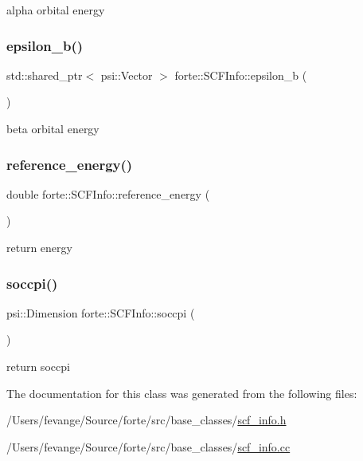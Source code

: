 alpha orbital energy 

\mbox{\label{classforte_1_1_s_c_f_info_ae7bece269ec34eee0f9e47bd07d69a44}} 
\subsubsection{\texorpdfstring{epsilon\+\_\+b()}{epsilon\_b()}}
{\footnotesize\ttfamily std\+::shared\+\_\+ptr$<$ psi\+::\+Vector $>$ forte\+::\+S\+C\+F\+Info\+::epsilon\+\_\+b (\begin{DoxyParamCaption}{ }\end{DoxyParamCaption})}



beta orbital energy 

\mbox{\label{classforte_1_1_s_c_f_info_ac2c9c172c0a76720d80c2aae2fe0fb92}} 
\subsubsection{\texorpdfstring{reference\+\_\+energy()}{reference\_energy()}}
{\footnotesize\ttfamily double forte\+::\+S\+C\+F\+Info\+::reference\+\_\+energy (\begin{DoxyParamCaption}{ }\end{DoxyParamCaption})}



return energy 

\mbox{\label{classforte_1_1_s_c_f_info_aa41db174bb41206fe98b4a5068e43fd4}} 
\subsubsection{\texorpdfstring{soccpi()}{soccpi()}}
{\footnotesize\ttfamily psi\+::\+Dimension forte\+::\+S\+C\+F\+Info\+::soccpi (\begin{DoxyParamCaption}{ }\end{DoxyParamCaption})}



return soccpi 



The documentation for this class was generated from the following files\+:\begin{DoxyCompactItemize}
\item 
/\+Users/fevange/\+Source/forte/src/base\+\_\+classes/\mbox{\hyperlink{scf__info_8h}{scf\+\_\+info.\+h}}\item 
/\+Users/fevange/\+Source/forte/src/base\+\_\+classes/\mbox{\hyperlink{scf__info_8cc}{scf\+\_\+info.\+cc}}\end{DoxyCompactItemize}
